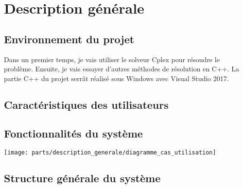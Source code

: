 \chapter{Description générale}

\section{Environnement du projet}
Dans un premier temps, je vais utiliser le solveur Cplex pour résoudre le problème.
Ensuite, je vais essayer d'autres méthodes de résolution en C++.
La partie C++ du projet serrât réalisé sous Windows avec Visual Studio 2017.
\section{Caractéristiques des utilisateurs}

\section{Fonctionnalités du système}
\texttt{[image: parts/description\_generale/diagramme\_cas\_utilisation]}

\section{Structure générale du système}